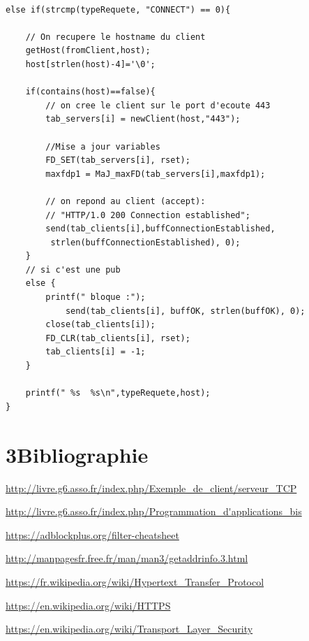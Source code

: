 \documentclass[12pt, a4paper]{report}
\begin{document}
\renewcommand{\lstlistingname}{Algorithm 2.4.}
\begin{lstlisting}[caption=Partie gérant l'HTTPS issue du CONNECT.]

else if(strcmp(typeRequete, "CONNECT") == 0){
			
	// On recupere le hostname du client
	getHost(fromClient,host);
	host[strlen(host)-4]='\0';
	
	if(contains(host)==false){
		// on cree le client sur le port d'ecoute 443
		tab_servers[i] = newClient(host,"443");

		//Mise a jour variables
		FD_SET(tab_servers[i], rset);
		maxfdp1 = MaJ_maxFD(tab_servers[i],maxfdp1);
		
		// on repond au client (accept): 
		// "HTTP/1.0 200 Connection established";
  		send(tab_clients[i],buffConnectionEstablished,
  		 strlen(buffConnectionEstablished), 0);
	}
	// si c'est une pub
	else {
		printf(" bloque :");
			send(tab_clients[i], buffOK, strlen(buffOK), 0);
		close(tab_clients[i]);
		FD_CLR(tab_clients[i], rset);
		tab_clients[i] = -1;
	}

	printf(" %s  %s\n",typeRequete,host);
}

\end{lstlisting}


\chapter*{3\hspace{1cm}Bibliographie}

\hspace{0.6cm}

\url{http://livre.g6.asso.fr/index.php/Exemple_de_client/serveur_TCP}

\url{http://livre.g6.asso.fr/index.php/Programmation_d'applications_bis}

\url{https://adblockplus.org/filter-cheatsheet}

\url{http://manpagesfr.free.fr/man/man3/getaddrinfo.3.html}

\url{https://fr.wikipedia.org/wiki/Hypertext_Transfer_Protocol}

\url{https://en.wikipedia.org/wiki/HTTPS}

\url{https://en.wikipedia.org/wiki/Transport_Layer_Security}
\end{document}

